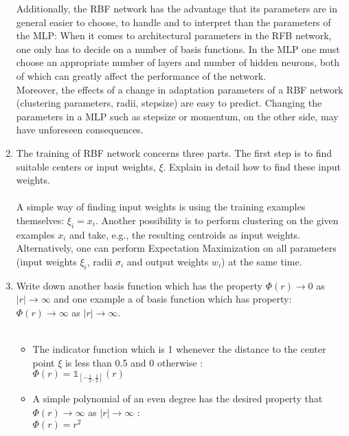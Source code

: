 \documentclass{article}
\newcommand\then{\rightarrow}
\begin{document}
\begin{enumerate}
        Additionally, the RBF network has the advantage that its parameters are
        in general easier to choose, to handle and to interpret than the
        parameters of the MLP: When it comes to architectural parameters in the
        RFB network, one only has to decide on a number of basis functions. In
        the MLP one must choose an appropriate number of layers and number of
        hidden neurons, both of which can greatly affect the performance of the
        network.\\
        Moreover, the effects of a change in adaptation parameters of a RBF
        network (clustering parameters, radii, stepsize) are easy to predict.
        Changing the parameters in a MLP such as stepsize or momentum, on the
        other side, may have unforeseen consequences.
    \item The training of RBF network concerns three parts. The first step is to
        find suitable centers or input weights, $\xi$. Explain in detail how to
        find these input weights.\\
        \\
        A simple way of finding input weights is using the training examples
        themselves: $\xi_i = x_i$.  Another possibility is to perform clustering
        on the given examples $x_i$ and take, e.g., the resulting centroids as
        input weights.  Alternatively, one can perform Expectation Maximization
        on all parameters (input weights $\xi_i$, radii $\sigma_i$ and output
        weights $w_i$) at the same time.
    \item  Write down another basis function which has the property $\Phi(r)
        \then 0$ as $|r| \then \infty$ and one example a of basis function
        which has property: $\Phi(r) \then \infty$ as $|r| \then
        \infty$.\\
        \\
        \begin{itemize}
        		\item The indicator function which is 1 whenever the distance to the center point $\xi$ is less than 0.5 and 0 otherwise : \\
		$\Phi(r) = \mathds{1}_{[-\frac{1}{2} , \frac{1}{2} ]} (r)$
        		\item A simple polynomial of an even degree has the desired property that $\Phi(r) \then \infty$ as $|r| \then
        \infty$ : \\
		$\Phi(r) = r^2$
        \end{itemize}
\end{enumerate}
\end{document}

